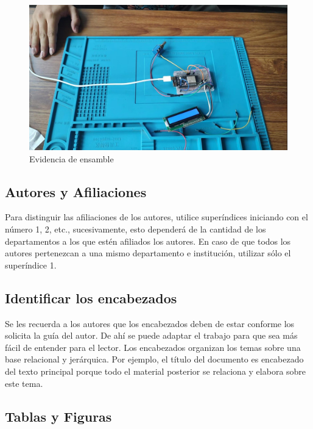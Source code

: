     \begin{figure}[H]
        \centering
        \includegraphics[trim = {10mm 10mm 10mm 10mm},clip,scale=0.2]{25/img/ensamble4.pdf}
        \caption{Evidencia de ensamble}
        \label{fig:Ensamble 4}
    \end{figure}
    
    \subsection{Autores y Afiliaciones}
    
    Para distinguir las afiliaciones de los autores, utilice superíndices iniciando con el número 1, 2, etc., sucesivamente, esto dependerá de la cantidad de los departamentos a los que estén afiliados los autores. En caso de que todos los autores pertenezcan a una mismo departamento e institución, utilizar sólo el superíndice 1. 
    
    \subsection{Identificar los encabezados}
    
    Se les recuerda a los autores que los encabezados deben de estar conforme los solicita la guía del autor. De ahí se puede adaptar el trabajo para que sea más fácil de entender para el lector.
    Los encabezados organizan los temas sobre una base relacional y jerárquica. Por ejemplo, el título del documento es encabezado del texto principal porque todo el material posterior se relaciona y elabora sobre este tema. 
    
    \subsection{Tablas y Figuras}
    
